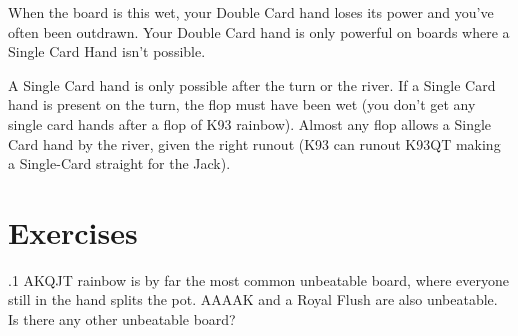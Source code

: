 When the board is this wet, your Double Card hand loses its power and
you've often been outdrawn. Your Double Card hand is only powerful on
boards where a Single Card Hand isn't possible.

A Single Card hand is only possible after the turn or the river. If a
Single Card hand is present on the turn, the flop must have been wet
(you don't get any single card hands after a flop of K93
rainbow). Almost any flop allows a Single Card hand by the river,
given the right runout (K93 can runout K93QT making a Single-Card
straight for the Jack).

\section{Exercises}

.1 AKQJT rainbow is by far the most common unbeatable
board, where everyone still in the hand splits the pot. AAAAK and a
Royal Flush are also unbeatable. Is there any other unbeatable board?
